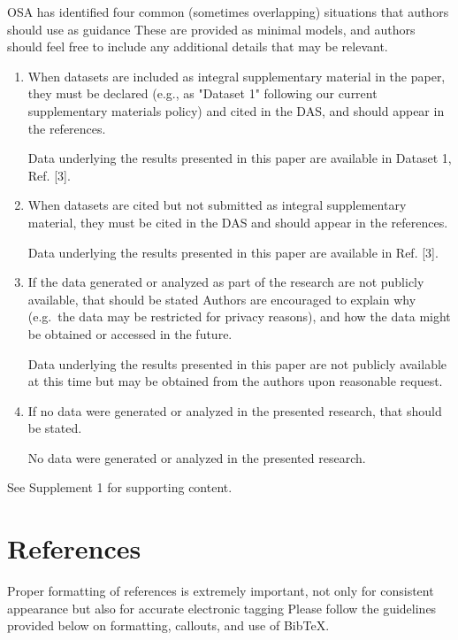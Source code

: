 \documentclass{osa-article}
\begin{document}
\begin{backmatter}
OSA has identified four common (sometimes overlapping) situations that authors should use as guidance
These are provided as minimal models, and authors should feel free to
include any additional details that may be relevant.

\begin{enumerate}
\item When datasets are included as integral supplementary material in the paper, they must be declared (e.g., as "Dataset 1" following our current supplementary materials policy) and cited in the DAS, and should appear in the references.

 Data underlying the results presented in this paper are available in Dataset 1, Ref. [3].

\bigskip

\item When datasets are cited but not submitted as integral supplementary material, they must be cited in the DAS and should appear in the references.

 Data underlying the results presented in this paper are available in Ref. [3].

\bigskip

\item If the data generated or analyzed as part of the research are not publicly available, that should be stated
Authors are encouraged to explain why (e.g.~the data may be restricted for privacy reasons), and how the data might be obtained or accessed in the future.

 Data underlying the results presented in this paper are not publicly available at this time but may be obtained from the authors upon reasonable request.

\bigskip

\item If no data were generated or analyzed in the presented research, that should be stated.

 No data were generated or analyzed in the presented research.
\end{enumerate}


See Supplement 1 for supporting content.

\end{backmatter}

\section{References}
\label{sec:refs}
Proper formatting of references is extremely important, not only for consistent appearance but also for accurate electronic tagging
Please follow the guidelines provided below on formatting, callouts, and use of Bib\TeX.
\end{document}
